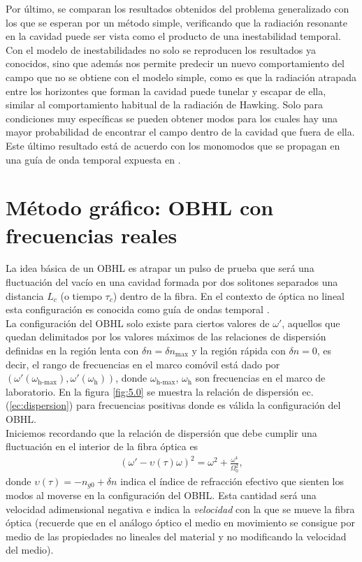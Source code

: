 Por \'{u}ltimo, se comparan los resultados obtenidos del problema generalizado con los que se esperan por un  m\'{e}todo simple, verificando que la radiaci\'{o}n resonante en la cavidad puede ser vista como el producto de una inestabilidad temporal. Con el modelo de inestabilidades no solo se reproducen los resultados ya conocidos, sino que adem\'{a}s  nos permite predecir un nuevo comportamiento del campo que no se obtiene con el modelo simple, como es que la radiaci\'{o}n atrapada entre los horizontes que forman la cavidad puede tunelar y escapar de ella, similar al comportamiento habitual  de la radiaci\'{o}n de Hawking. Solo para condiciones muy espec\'{i}ficas se pueden obtener modos para los cuales hay una mayor probabilidad de encontrar el campo dentro de la cavidad que fuera de ella. Este \'{u}ltimo  resultado est\'{a} de acuerdo con los monomodos que se propagan en una gu\'{i}a de onda temporal expuesta en \cite{Plansinis2016}.
\section{M\'{e}todo gr\'{a}fico: OBHL con frecuencias reales}\label{realo}

La idea básica de un OBHL es atrapar un pulso de prueba que ser\'{a} una fluctuaci\'{o}n del vac\'{i}o  en una cavidad formada por dos solitones separados una distancia $L_c$ (o tiempo $\tau_c$) dentro de la fibra. En el contexto de \'{o}ptica no lineal esta configuraci\'{o}n es conocida como gu\'{i}a de ondas temporal \citep{Plansinis2016}.\\

La configuraci\'{o}n del OBHL solo existe para ciertos valores de $\omega'$, aquellos que quedan delimitados por los valores m\'{a}ximos de las relaciones de dispersi\'{o}n definidas en la regi\'{o}n lenta con $\delta n=\delta n_{\text{max}}$ y la regi\'{o}n r\'{a}pida con $\delta n=0$, es decir, el rango de frecuencias en el marco com\'{o}vil est\'{a} dado por $(\omega'(\omega_{\text{h-max}}),\omega'(\omega_{\text{h}}))$, donde $\omega_{\text{h-max}}$, $\omega_{\text{h}}$ son frecuencias en el marco de laboratorio. En la figura \ref{fig:5.0} se muestra la relaci\'{o}n de dispersi\'{o}n ec. (\ref{ec:dispersion}) para frecuencias positivas donde es v\'{a}lida la configuraci\'{o}n del OBHL. \\

Iniciemos recordando que la relaci\'{o}n de dispersi\'{o}n que debe cumplir una fluctuaci\'{o}n en el interior de la fibra \'{o}ptica es
\begin{align}\label{ec:dispersion}
(\omega'-\upsilon (\tau)\omega)^2=\omega^2+\frac{\omega^4}{\Omega_0^2},
\end{align}
donde $\upsilon(\tau)=-n_{g0}+\delta n$ indica el \'{i}ndice de refracci\'{o}n efectivo que sienten los modos al moverse en la configuraci\'{o}n del OBHL. Esta cantidad ser\'{a} una velocidad adimensional negativa e indica la \textit{ velocidad} con la que se mueve la fibra \'{o}ptica (recuerde que en el an\'{a}logo \'{o}ptico el medio en movimiento se consigue por medio de las propiedades no lineales del material y no modificando la velocidad del medio).\\





